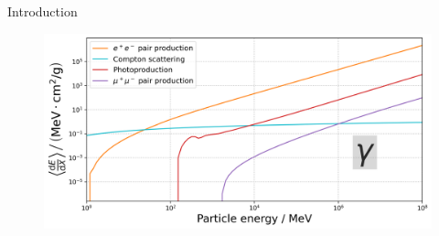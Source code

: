 \documentclass[t]{beamer}
\begin{document}
\begin{block}[equal height group=A]{Introduction}
\begin{multicols}{2}
\begin{multicols}{2}
\begin{figure}
            \end{figure}
            \begin{figure}
              \includegraphics[width=\linewidth, height=.4\textheight, keepaspectratio]{plots/photon_dEdx.png}
            \end{figure}
          \end{multicols}

        \end{multicols}
      \end{block}%
\end{document}
